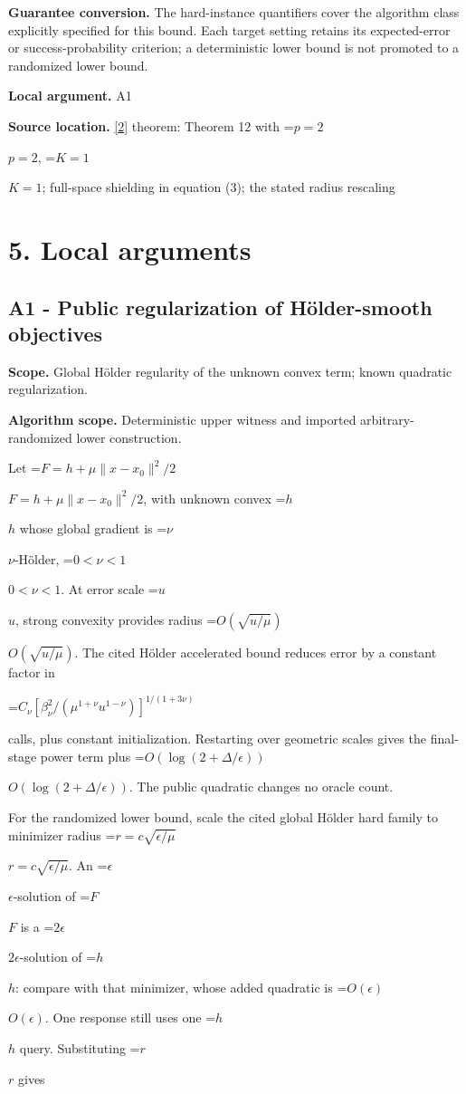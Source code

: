 \documentclass[10pt,a4paper]{article}
\newcommand{\AtlasMath}[1]{\par\begingroup\centering\setbox0=\hbox{$\displaystyle #1$}\ifdim\wd0>1.4\linewidth\typeout{ATLAS WIDE FORMULA: \the\wd0}\fi\ifdim\wd0>\linewidth\resizebox{\linewidth}{!}{\box0}\else\box0\fi\par\endgroup}
\newcommand{\AtlasInlineMath}[1]{\begingroup\setbox0=\hbox{$#1$}\ifdim\wd0>.4\linewidth\endgroup\AtlasMath{#1}\else\endgroup$#1$\fi}
\begin{document}
\textbf{Guarantee conversion.} The hard-instance quantifiers cover the algorithm class explicitly specified for this bound. Each target setting retains its expected-error or success-probability criterion; a deterministic lower bound is not promoted to a randomized lower bound.

\textbf{Local argument.} A1

\textbf{Source location.} \href{https://proceedings.mlr.press/v99/diakonikolas19c/diakonikolas19c.pdf}{[2]} theorem: Theorem 12 with \AtlasInlineMath{p=2}, \AtlasInlineMath{K=1}; full-space shielding in equation (3); the stated radius rescaling

\section{5. Local arguments}
\subsection{A1 - Public regularization of Hölder-smooth objectives}
\textbf{Scope.} Global Hölder regularity of the unknown convex term; known quadratic regularization.

\textbf{Algorithm scope.} Deterministic upper witness and imported arbitrary-randomized lower construction.

Let \AtlasInlineMath{F=h+\mu\|x-x_0\|^2/2}, with unknown convex \AtlasInlineMath{h} whose global gradient is \AtlasInlineMath{\nu}-Hölder, \AtlasInlineMath{0<\nu<1}. At error scale \AtlasInlineMath{u}, strong convexity provides radius \AtlasInlineMath{O(\sqrt{u/\mu})}. The cited Hölder accelerated bound reduces error by a constant factor in

\AtlasMath{C_\nu[\beta_\nu^2/(\mu^{1+\nu}u^{1-\nu})]^{1/(1+3\nu)}}

calls, plus constant initialization. Restarting over geometric scales gives the final-stage power term plus \AtlasInlineMath{O(\log(2+\Delta/\epsilon))}. The public quadratic changes no oracle count.

For the randomized lower bound, scale the cited global Hölder hard family to minimizer radius \AtlasInlineMath{r=c\sqrt{\epsilon/\mu}}. An \AtlasInlineMath{\epsilon}-solution of \AtlasInlineMath{F} is a \AtlasInlineMath{2\epsilon}-solution of \AtlasInlineMath{h}: compare with that minimizer, whose added quadratic is \AtlasInlineMath{O(\epsilon)}. One response still uses one \AtlasInlineMath{h} query. Substituting \AtlasInlineMath{r} gives
\end{document}
